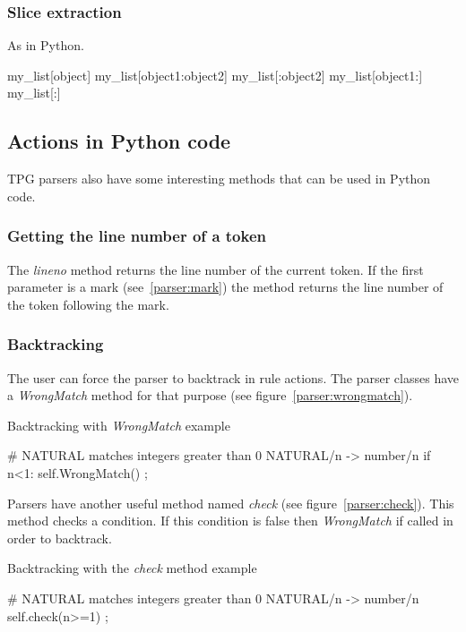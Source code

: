 \subsubsection{Slice extraction}

As in Python.

\begin{verbatimtab}[4]
	my_list[object]
	my_list[object1:object2]
	my_list[:object2]
	my_list[object1:]
	my_list[:]
\end{verbatimtab}

\subsection{Actions in Python code}

TPG parsers also have some interesting methods that can be used in Python code.

\subsubsection{Getting the line number of a token}

The \emph{lineno} method returns the line number of the current token.
If the first parameter is a mark (see~\ref{parser:mark}) the method returns the line number of the token following the mark.

\subsubsection{Backtracking}

The user can force the parser to backtrack in rule actions.
The parser classes have a \emph{WrongMatch} method for that purpose (see figure~\ref{parser:wrongmatch}).

\begin{code}
\caption{Backtracking with \emph{WrongMatch} example}			\label{parser:wrongmatch}
\begin{verbatimtab}[4]
	# NATURAL matches integers greater than 0
	NATURAL/n ->
		number/n
		{{ if n<1: self.WrongMatch() }}
		;
\end{verbatimtab}
\end{code}

Parsers have another useful method named \emph{check} (see figure~\ref{parser:check}).
This method checks a condition.
If this condition is false then \emph{WrongMatch} if called in order to backtrack.

\begin{code}
\caption{Backtracking with the \emph{check} method example}		\label{parser:check}
\begin{verbatimtab}[4]
	# NATURAL matches integers greater than 0
	NATURAL/n ->
		number/n
		{{ self.check(n>=1) }}
		;
\end{verbatimtab}
\end{code}

